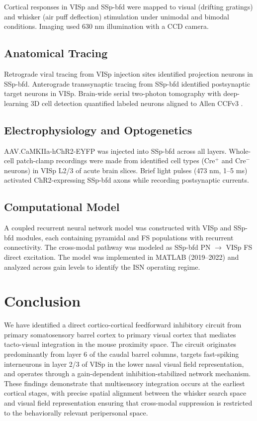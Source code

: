 \documentclass[11pt]{article}
\begin{document}
Cortical responses in VISp and SSp-bfd were mapped to visual (drifting gratings) and whisker (air puff deflection) stimulation under unimodal and bimodal conditions. Imaging used 630 nm illumination with a CCD camera.

\subsection{Anatomical Tracing}

Retrograde viral tracing from VISp injection sites identified projection neurons in SSp-bfd. Anterograde transsynaptic tracing from SSp-bfd identified postsynaptic target neurons in VISp. Brain-wide serial two-photon tomography with deep-learning 3D cell detection \citep{tyson2022accurate} quantified labeled neurons aligned to Allen CCFv3 \citep{wang2020allen}.

\subsection{Electrophysiology and Optogenetics}

AAV.CaMKIIa-hChR2-EYFP was injected into SSp-bfd across all layers. Whole-cell patch-clamp recordings were made from identified cell types (Cre$^+$ and Cre$^-$ neurons) in VISp L2/3 of acute brain slices. Brief light pulses (473 nm, 1--5 ms) activated ChR2-expressing SSp-bfd axons while recording postsynaptic currents.

\subsection{Computational Model}

A coupled recurrent neural network model was constructed with VISp and SSp-bfd modules, each containing pyramidal and FS populations with recurrent connectivity. The cross-modal pathway was modeled as SSp-bfd PN $\rightarrow$ VISp FS direct excitation. The model was implemented in MATLAB (2019--2022) and analyzed across gain levels to identify the ISN operating regime.

\section{Conclusion}

We have identified a direct cortico-cortical feedforward inhibitory circuit from primary somatosensory barrel cortex to primary visual cortex that mediates tacto-visual integration in the mouse proximity space. The circuit originates predominantly from layer 6 of the caudal barrel columns, targets fast-spiking interneurons in layer 2/3 of VISp in the lower nasal visual field representation, and operates through a gain-dependent inhibition-stabilized network mechanism. These findings demonstrate that multisensory integration occurs at the earliest cortical stages, with precise spatial alignment between the whisker search space and visual field representation ensuring that cross-modal suppression is restricted to the behaviorally relevant peripersonal space.



\end{document}

